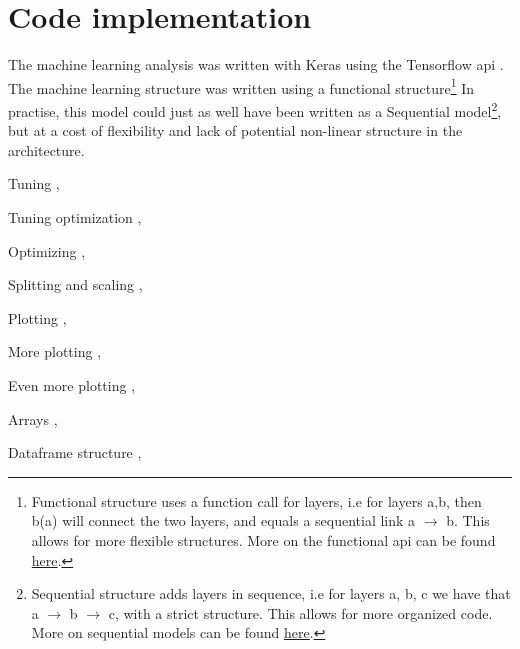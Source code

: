 \section*{Code implementation}

The machine learning analysis was written with Keras using the Tensorflow api\cite{tensorflow2015-whitepaper} \cite{chollet2015keras}. 
The machine learning structure was written using a functional structure\footnote{Functional structure uses a function call for layers, i.e for layers a,b, then b(a) will connect the two layers, and equals a sequential link a $\to$ b. This allows for more flexible structures. More on the functional api can be found \href{https://www.tensorflow.org/guide/keras/functional}{here}.}
In practise, this model could just as well have been written as a Sequential model\footnote{Sequential structure adds layers in sequence, i.e for layers a, b, c we have that a $\to$ b $\to$ c, with a strict structure. This allows for more organized code. More on sequential models can be found \href{https://www.tensorflow.org/guide/keras/sequential_model}{here}.}, 
but at a cost of flexibility and lack of potential non-linear structure in the architecture.\par
Tuning \cite{omalley2019kerastuner}, \par 
Tuning optimization \cite{hyperband:opt}, \par
Optimizing \cite{ADAM:opti}, \par 
Splitting and scaling \cite{scikit-learn}, \par
Plotting \cite{Hunter:2007}, \par
More plotting  \cite{Waskom2021}, \par
Even more plotting \cite{plotly}, \par
Arrays \cite{harris2020array}, \par 
Dataframe structure \cite{reback2020pandas}, \par